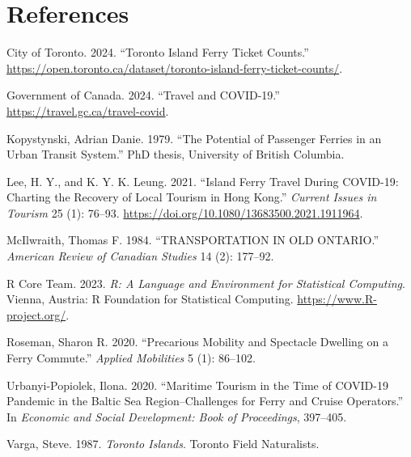 \documentclass[
  letterpaper,
  DIV=11,
  numbers=noendperiod]{scrartcl}
\newlength{\cslhangindent}
\newenvironment{CSLReferences}[2] %
 {\begin{list}{}{%
  \setlength{\itemindent}{0pt}
  \setlength{\leftmargin}{0pt}
  \setlength{\parsep}{0pt}
  \ifodd #1
   \setlength{\leftmargin}{\cslhangindent}
   \setlength{\itemindent}{-1\cslhangindent}
  \fi
  \setlength{\itemsep}{#2\baselineskip}}}
 {\end{list}}
\begin{document}
\newpage

\section*{References}\label{sec-references}

\label{refs}
\begin{CSLReferences}{1}{0}
City of Toronto. 2024. {``Toronto Island Ferry Ticket Counts.''}
\url{https://open.toronto.ca/dataset/toronto-island-ferry-ticket-counts/}.

Government of Canada. 2024. {``Travel and COVID-19.''}
\url{https://travel.gc.ca/travel-covid}.

Kopystynski, Adrian Danie. 1979. {``The Potential of Passenger Ferries
in an Urban Transit System.''} PhD thesis, University of British
Columbia.

Lee, H. Y., and K. Y. K. Leung. 2021. {``Island Ferry Travel During
COVID-19: Charting the Recovery of Local Tourism in Hong Kong.''}
\emph{Current Issues in Tourism} 25 (1): 76--93.
\url{https://doi.org/10.1080/13683500.2021.1911964}.

McIlwraith, Thomas F. 1984. {``TRANSPORTATION IN OLD ONTARIO.''}
\emph{American Review of Canadian Studies} 14 (2): 177--92.

R Core Team. 2023. \emph{R: A Language and Environment for Statistical
Computing}. Vienna, Austria: R Foundation for Statistical Computing.
\url{https://www.R-project.org/}.

Roseman, Sharon R. 2020. {``Precarious Mobility and Spectacle Dwelling
on a Ferry Commute.''} \emph{Applied Mobilities} 5 (1): 86--102.

Urbanyi-Popiolek, Ilona. 2020. {``Maritime Tourism in the Time of
COVID-19 Pandemic in the Baltic Sea Region--Challenges for Ferry and
Cruise Operators.''} In \emph{Economic and Social Development: Book of
Proceedings}, 397--405.

Varga, Steve. 1987. \emph{Toronto Islands}. Toronto Field Naturalists.


\end{CSLReferences}
\end{document}
